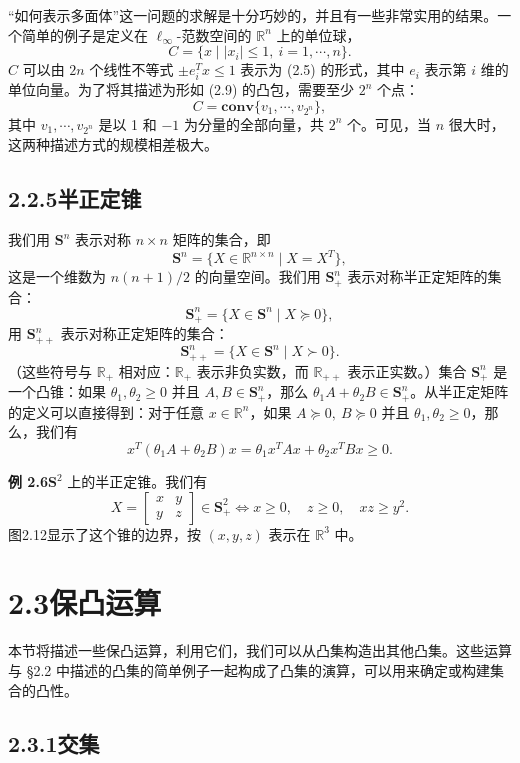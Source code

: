 \documentclass[UTF8, 12pt, fontset=fandol, oneside]{ctexart}
\begin{document}
``如何表示多面体''这一问题的求解是十分巧妙的，并且有一些非常实用的结果。一个简单的例子是定义在 $\ell_\infty$-范数空间的 $\mathbb{R}^n$ 上的单位球，
\[
  C=\{x\mid |x_i|\le 1,\ i=1,\cdots,n\}.
\]
$C$ 可以由 $2n$ 个线性不等式 $\pm e_i^Tx\le 1$ 表示为 (2.5) 的形式，其中 $e_i$ 表示第 $i$ 维的单位向量。为了将其描述为形如 (2.9) 的凸包，需要至少 $2^n$ 个点：
\[
  C=\mathbf{conv}\{v_1,\cdots,v_{2^n}\},
\]
其中 $v_1,\cdots,v_{2^n}$ 是以 1 和 $-1$ 为分量的全部向量，共 $2^n$ 个。可见，当 $n$ 很大时，这两种描述方式的规模相差极大。

\subsection*{2.2.5\quad 半正定锥}

我们用 $\mathbf{S}^n$ 表示对称 $n\times n$ 矩阵的集合，即
\[
  \mathbf{S}^n=\{X\in\mathbb{R}^{n\times n}\mid X=X^T\},
\]
这是一个维数为 $n(n+1)/2$ 的向量空间。我们用 $\mathbf{S}_+^n$ 表示对称半正定矩阵的集合：
\[
  \mathbf{S}_+^n=\{X\in\mathbf{S}^n\mid X\succeq 0\},
\]
用 $\mathbf{S}_{++}^n$ 表示对称正定矩阵的集合：
\[
  \mathbf{S}_{++}^n=\{X\in\mathbf{S}^n\mid X\succ 0\}.
\]
（这些符号与 $\mathbb{R}_+$ 相对应：$\mathbb{R}_+$ 表示非负实数，而 $\mathbb{R}_{++}$ 表示正实数。）集合 $\mathbf{S}_+^n$ 是一个凸锥：如果 $\theta_1,\theta_2\ge 0$ 并且 $A,B\in\mathbf{S}_+^n$，那么 $\theta_1A+\theta_2B\in\mathbf{S}_+^n$。从半正定矩阵的定义可以直接得到：对于任意 $x\in\mathbb{R}^n$，如果 $A\succeq 0,\ B\succeq 0$ 并且 $\theta_1,\theta_2\ge 0$，那么，我们有
\[
  x^T(\theta_1A+\theta_2B)x=\theta_1x^TAx+\theta_2x^TBx\ge 0.
\]

\noindent\textbf{例 2.6}\quad $\mathbf{S}^2$ 上的半正定锥。我们有
\[
  X=
  \begin{bmatrix}
    x & y\\
    y & z
  \end{bmatrix}\in\mathbf{S}_+^2
  \Longleftrightarrow
  x\ge 0,\quad z\ge 0,\quad xz\ge y^2.
\]
图2.12显示了这个锥的边界，按 $(x,y,z)$ 表示在 $\mathbb{R}^3$ 中。

\section*{2.3\quad 保凸运算}

本节将描述一些保凸运算，利用它们，我们可以从凸集构造出其他凸集。这些运算与 §2.2 中描述的凸集的简单例子一起构成了凸集的演算，可以用来确定或构建集合的凸性。

\subsection*{2.3.1\quad 交集}
\end{document}
